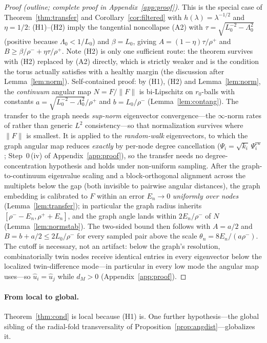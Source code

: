 \documentclass[11pt]{article}
\theoremstyle{remark}
\begin{document}
\begin{proof}[Proof (outline; complete proof in Appendix~\ref{app:proof})]
This is the special case of Theorem~\ref{thm:transfer} and
Corollary~\ref{cor:filtered} with $h(\lambda)=\lambda^{-1/2}$ and $\eta=1/2$:
(H1)--(H2) imply the tangential noncollapse (A2) with
$\tau=\sqrt{L_0^{-2}-\Lambda_0^2}$ (positive because $\Lambda_0<1/L_0$) and
$\beta=L_0$, giving $A=(1-\eta)\tau/\rho^+$ and
$B\ge\beta/\rho^-+\eta\tau/\rho^+$. Note (H2) is only one sufficient route:
the theorem survives with (H2) replaced by (A2) directly, which is strictly
weaker and is the condition the torus actually satisfies with a healthy
margin (the discussion after Lemma~\ref{lem:norm}). Self-contained proof:
by (H1), (H2) and Lemma~\ref{lem:norm}, the \emph{continuum} angular map
$N=F/\lVert F\rVert$ is bi-Lipschitz on $r_0$-balls with constants
$a=\sqrt{L_0^{-2}-\Lambda_0^2}/\rho^+$ and $b=L_0/\rho^-$
(Lemma~\ref{lem:contang}). The transfer to the graph needs \emph{sup-norm}
eigenvector convergence---the $\infty$-norm rates of \cite{calder2022} rather
than generic $L^2$ consistency---so that normalization survives where
$\lVert F\rVert$ is smallest. It is applied to the \emph{random-walk}
eigenvectors, to which the graph angular map reduces \emph{exactly} by per-node
degree cancellation ($\Psi_i=\sqrt{k_i}\,\Psi^{\mathrm{rw}}_i$; Step~0\,(iv) of
Appendix~\ref{app:proof}), so the transfer needs no degree-concentration
hypothesis and holds under non-uniform sampling. After the graph-to-continuum
eigenvalue scaling
and a block-orthogonal alignment across the multiplets below the gap (both
invisible to pairwise angular distances), the graph embedding is calibrated to
$F$ within an error $E_n\to0$ \emph{uniformly over nodes}
(Lemma~\ref{lem:transfer}); in particular the graph radius inherits
$[\rho^--E_n,\rho^++E_n]$, and the graph angle lands within $2E_n/\rho^-$ of $N$
(Lemma~\ref{lem:normstab}). The two-sided bound then follows with $A=a/2$ and
$B=b+a/2\le2L_0/\rho^-$ for every sampled pair above the scale
$\theta_n=8E_n/(a\rho^-)$. The cutoff is necessary, not an artifact: below the
graph's resolution, combinatorially twin nodes receive identical entries in
every eigenvector below the localized twin-difference mode---in particular in
every low mode the angular map uses---so $\hat u_i=\hat u_j$ while $d_M>0$
(Appendix~\ref{app:proof}).
\end{proof}

\paragraph{From local to global.} Theorem~\ref{thm:cond} is local because
(H1) is. One further hypothesis---the global sibling of the radial-fold
transversality of Proposition~\ref{prop:angdist}---globalizes it.
\end{document}
